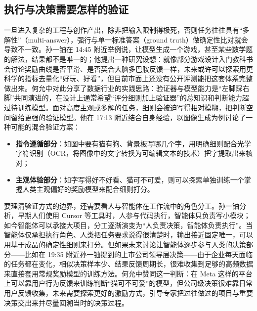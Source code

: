\documentclass[UTF8,a4paper,11pt,fontset=fandol]{ctexart}
\begin{document}
\subsection{执行与决策需要怎样的验证}
一旦进入复杂的工程与创作产出，除非把输入限制得极死，否则任务往往具有“多解性”（multi-answer），强行与单一标准答案（ground truth）做确定性比对就会导致不一致。孙一铀在 14:45 附近举例说，让模型生成一个游戏，甚至某些数学题的解法，结果都不是唯一的；他提出一种研究设想：就像部分游戏设计入门教科书会讨论奖励曲线是否平滑、是否契合大脑多巴胺反馈一样，未来或许可以探索用更科学的指标去量化“好玩、好看”，但目前市面上还没有公开评测能把这套体系完整做出来。何允中对此分享了数据行业的实践思路：验证器与模型能力是“左脚踩右脚”共同演进的，在设计上通常希望“评分细则加上验证器”的总知识和判断能力超过待训练模型。面对高度主观或多解的任务，细则会被迫写得相对模糊，把判断空间留给更强的验证模型。他在 17:13 附近结合自身经验，以图像生成为例讨论了一种可能的混合验证方案：
\begin{itemize}
\item \textbf{指令遵循部分}：如图中要有猫有狗、背景板写哪几个字，用明确细则配合光学字符识别（OCR，将图像中的文字转换为可编辑文本的技术）把字提取出来核对；
\item \textbf{主观体验部分}：如字写得好不好看、猫可不可爱，则可以探索单独训练一个掌握人类主观偏好的奖励模型来配合细则打分。
\end{itemize}

要理清验证方式的边界，还需要看人与智能体在工作流中的角色分工。孙一铀分析，早期人们使用 Cursor 等工具时，人参与代码执行，智能体只负责写小模块；如今智能体可以承接大项目，分工逐渐演变为“人负责决策，智能体负责执行”。当智能体仅承担执行角色、人类把任务要求说得很清楚时，输出接近固定唯一，可以用基于成品的确定性细则来打分。但如果未来讨论让智能体逐步参与人类的决策部分——比如在 19:35 附近孙一铀提到的上市公司领导层决策——由于企业每天面临的任务都在变化，相似决策样本少、结果反馈周期长，很难收集到足够的高频数据来直接套用常规奖励模型的训练方法。何允中赞同这一判断：在 Meta 这样的平台上可以靠用户行为反馈来训练判断“猫可不可爱”的模型，但公司级决策很难靠日常用户反馈收集，未来需要探索更好的激励方式，引导专家把过往做过的项目与重要决策交出来并尽量回溯当时的决策过程。
\end{document}

